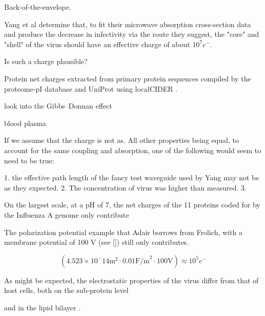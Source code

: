 \documentclass[paper.tex]{subfiles}
\begin{document}
Back-of-the-envelope.


Yang et al determine that, to fit their microwave absorption cross-section data and produce the decrease in infectivity via the route they suggest, the "core" and "shell" of the virus should have an effective charge of about $10^7 e^-$. 

Is such a charge plausible?

Protein net charges extracted from primary protein sequences compiled by the proteome-pI database \cite{ProteomepI2017} and UniProt using localCIDER \cite{CIDER2017} . 


look into the Gibbs–Donnan effect



blood plasma


If we assume that the charge is not as. All other properties being equal, to account for the same coupling and absorption, one of the following would seem to need to be true:

1. the effective path length of the fancy test waveguide used by Yang may not be as they expected.
2. The concentration of virus was higher than measured.
3. 




On the largest scale, at a pH of 7, the net charges of the 11 proteins coded for by the Influenza A genome only contribute 


The polarization potential example that Adair borrows from Frolich, with a membrane potential of 100 V (see []) still only contributes.  

$$(4.523 \times 10^-14 \text{m}^2 \cdot 0.01 \text{F/m}^2 \cdot 100 \text{V}) \approx 10^5 e^- $$







As might be expected, the electrostatic properties of the virus differ from that of host cells, both on the sub-protein level\footnotemark


and in the lipid bilayer \cite{Lipid2015} \footnotemark.
\end{document}
